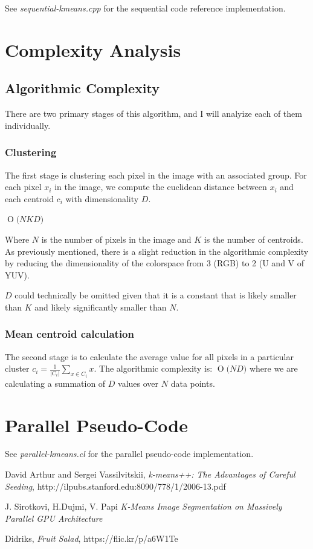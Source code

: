 \documentclass[11pt]{article}
\newcommand{\BigO}[1]{\ensuremath{\operatorname{O}\bigl(#1\bigr)}}
\begin{document}
See \emph{sequential-kmeans.cpp} for the sequential code reference implementation.

\section{Complexity Analysis}

\subsection{Algorithmic Complexity}

There are two primary stages of this algorithm, and I will analyize each of them individually.

\subsubsection{Clustering}

The first stage is clustering each pixel in the image with an associated group. For
each pixel $x_i$ in the image, we compute the euclidean distance between $x_i$
and each centroid $c_i$ with dimensionality $D$.

$\BigO{NKD}$

Where $N$ is the number of pixels in the image and $K$ is the number of centroids. As
previously mentioned, there is a slight reduction in the algorithmic complexity by
reducing the dimensionality of the colorspace from 3 (RGB) to 2 (U and V of YUV).

$D$ could technically be omitted given that it is a constant that is likely smaller
than $K$ and likely significantly smaller than $N$.

\subsubsection{Mean centroid calculation}

The second stage is to calculate the average value for all pixels in a particular cluster $c_i = \frac{1}{|C_i|}\sum_{x \in C_i}x$. The algorithmic complexity is: $\BigO{ND}$ where we are calculating a summation of $D$ values over $N$ data points.

\section{Parallel Pseudo-Code}

See \emph{parallel-kmeans.cl} for the parallel pseudo-code implementation.


\begin{thebibliography}{9}

  David Arthur and Sergei Vassilvitskii,
  \emph{k-means++: The Advantages of Careful Seeding},
  http://ilpubs.stanford.edu:8090/778/1/2006-13.pdf

  J. Sirotkovi, H.Dujmi, V. Papi
  \emph{K-Means Image Segmentation on Massively Parallel GPU Architecture}

  Didriks,
  \emph{Fruit Salad},
  https://flic.kr/p/a6W1Te

\end{thebibliography}
\end{document}

